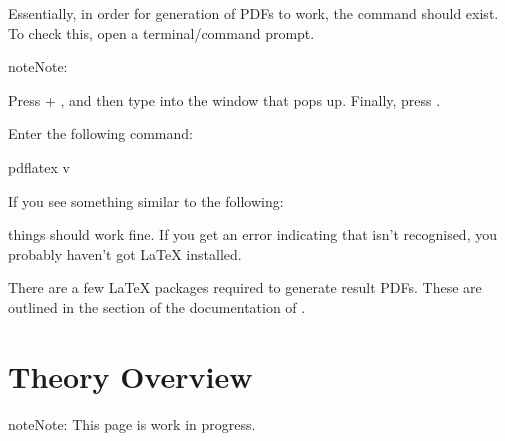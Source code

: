 \documentclass[letterpaper,10pt,english]{sphinxmanual}
\begin{document}
\sphinxAtStartPar
Essentially, in order for generation of PDFs to work, the command 
should exist. To check this, open a terminal/command prompt.

\begin{sphinxadmonition}{note}{Note:}
\sphinxAtStartPar
{}

\sphinxAtStartPar
Press  + , and then type  into the
window that pops up. Finally, press .
\end{sphinxadmonition}

\sphinxAtStartPar
Enter the following command:

\begin{sphinxVerbatim}[commandchars=\\\{\}]
\PYGZdl{} pdflatex \PYGZhy{}v
\end{sphinxVerbatim}

\sphinxAtStartPar
If you see something similar to the following:

\begin{sphinxVerbatim}[commandchars=\\\{\}]
    
  
       

\end{sphinxVerbatim}

\sphinxAtStartPar
things should work fine. If you get an error indicating that 
isn’t recognised, you probably haven’t got LaTeX installed.

\sphinxAtStartPar
There are a few LaTeX packages required to generate result PDFs. These
are outlined in the  section of the documentation of
{\hyperref[\detokenize{references/write:nmrespy.write.write_result}]{}}.




\chapter{Theory Overview}
\label{\detokenize{theory_overview:theory-overview}}\label{\detokenize{theory_overview::doc}}
\begin{sphinxadmonition}{note}{Note:}
\sphinxAtStartPar
This page is work in progress.
\end{sphinxadmonition}
\end{document}
